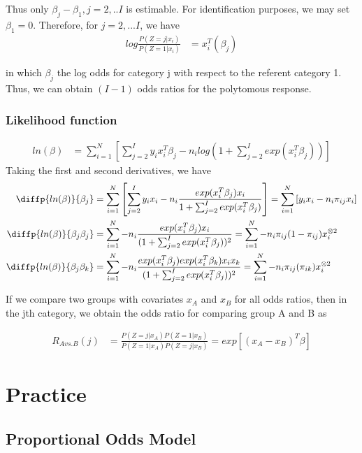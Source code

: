 \documentclass{article}
\begin{document}
Thus only $\beta_j-\beta_1, j=2,..I$ is estimable. For identification purposes, we may set $\beta_1 = 0$. Therefore, for $j=2,...I$, we have
\begin{align*}
    log \frac{P(Z=j|x_i)}{P(Z=1|x_i)} &= x_i^T(\beta_j)
\end{align*}

in which  $\beta_j$ the log odds for category j with respect to the referent category 1. Thus, we can obtain $ (I- 1)$ odds ratios for the polytomous response. 

 \subsubsection{Likelihood function} 

\begin{align*}
   ln(\beta) &= \sum_{i=1}^N \left[ \sum_{j=2}^I y_i x_i^T \beta_j  - n_i log(1+ \sum_{j=2}^I  exp( x_i^T\beta_j)) \right]
\end{align*}
Taking the first and second derivatives, we have
\begin{align*}
  \diffp {ln(\beta)}{{\beta_j}} &= \sum_{i=1}^N \left[\sum_{j=2}^I y_i x_i - n_i  \frac{exp(x_i^T\beta_j) x_i}{1+ \sum_{j=2}^I exp(x_i^T\beta_j)} \right] = \sum_{i=1}^N \left[ y_i x_i - n_i  \pi_{ij} x_i \right]\\
 \diffp {ln(\beta)}{{\beta_j} {\beta_j}} &=  \sum_{i=1}^N - n_i  \frac{exp(x_i^T\beta_j) x_i}{(1+ \sum_{j=2}^I exp(x_i^T\beta_j))^2} =  \sum_{i=1}^N - n_i \pi_{ij} (1-\pi_{ij}) x_i^{\otimes 2}\\
 \diffp {ln(\beta)}{{\beta_j} {\beta_k}} &=  \sum_{i=1}^N - n_i  \frac{exp(x_i^T\beta_j) exp(x_i^T\beta_k) x_i  x_k }{(1+ \sum_{j=2}^I exp(x_i^T\beta_j))^2} =  \sum_{i=1}^N - n_i \pi_{ij} (\pi_{ik})  x_i^{\otimes 2}
\end{align*}


If we compare two groups with covariates $x_A$ and $x_B$ for all odds ratios, then in the jth category, we obtain the odds ratio for comparing group A and B as

\begin{align*}
    R_{A vs. B}(j) &= \frac{P(Z=j| x_A) P(Z=1| x_B)}{P(Z=1| x_A) P(Z=j| x_B)} = exp[(x_A-x_B)^T\beta]
\end{align*}

\section{Practice}
\subsection{Proportional Odds Model}
\end{document}
